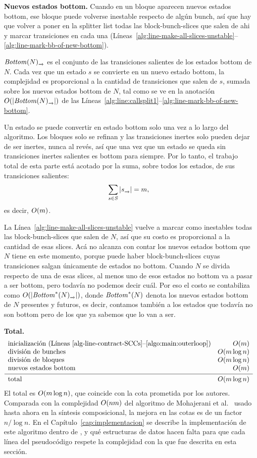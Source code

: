 \textbf{Nuevos estados bottom.} Cuando en un bloque aparecen nuevos estados bottom, ese bloque puede volverse inestable respecto de algún bunch, así que hay que volver a poner en la splitter list todas las block-bunch-slices que salen de ahi y marcar transiciones en cada una (Líneas~\ref{alg:line-make-all-slices-unstable}--\ref{alg:line-mark-bb-of-new-bottom}).

$\Bottom(N)_{\pijl{}}$ es el conjunto de las transiciones salientes de los estados bottom de $N$. Cada vez que un estado $s$ se convierte en un nuevo estado bottom, la complejidad es proporcional a la cantidad de transiciones que salen de $s$, sumada sobre los nuevos estados bottom de $N$, tal como se ve en la anotación $\bigo{\size{\Bottom(N)_{\pijl{}}}}$ de las Líneas~\ref{alg:line:callsplit1}--\ref{alg:line-mark-bb-of-new-bottom}.

Un estado se puede convertir en estado bottom solo una vez a lo largo del algoritmo. Los bloques solo se refinan y las transiciones inertes solo pueden dejar de ser inertes, nunca al revés, así que una vez que un estado se queda sin transiciones inertes salientes es bottom para siempre. Por lo tanto, el trabajo total de esta parte está acotado por la suma, sobre todos los estados, de sus transiciones salientes:
\[
\sum_{s \in S} \size{s_{\pijl{}}} = m,
\]
es decir, ${O\!\left(m\right)}$.

La Línea~\ref{alg:line-make-all-slices-unstable} vuelve a marcar como inestables todas las block-bunch-slices que salen de $N$, así que su costo es proporcional a la cantidad de esas slices. Acá no alcanza con contar los nuevos estados bottom que $N$ tiene en este momento, porque puede haber block-bunch-slices cuyas transiciones salgan únicamente de estados no bottom. Cuando $N$ se divida respecto de una de esas slices, al menos uno de esos estados no bottom va a pasar a ser bottom, pero todavía no podemos decir cuál. Por eso el costo se contabiliza como $\bigo{\size{\Bottom^{*}(N)_{\pijl{}}}}$, donde $\mathit{Bottom}^{*}(N)$ denota los nuevos estados bottom de $N$ presentes y futuros, es decir, contamos también a los estados que todavía no son bottom pero de los que ya sabemos que lo van a ser.

\textbf{Total.} 
\[
\begin{array}{lr}
\text{inicialización (Líneas~\ref{alg-line-contract-SCCs}--\ref{algo:main:outerloop})} & \bigo{m} \\
\text{división de bunches} & \bigo{m \log n} \\
\text{división de bloques} & \bigo{m \log n} \\
\text{nuevos estados bottom} & \bigo{m} \\[2pt]
\hline
\rule{0pt}{2.4ex}\text{total} & \bigo{m \log n}
\end{array}
\]
El total es ${O\!\left(m \log n\right)}$, que coincide con la cota prometida por los autores. Comparada con la complejidad ${O\!\left(nm\right)}$ del algoritmo de Mohajerani et al.~\cite{wsoe} usado hasta ahora en la síntesis composicional, la mejora en las cotas es de un factor $n / \log n$. En el Capítulo~\ref{cap:implementacion} se describe la implementación de este algoritmo dentro de \MTSA, y qué estructuras de datos hacen falta para que cada línea del pseudocódigo respete la complejidad con la que fue descrita en esta sección.